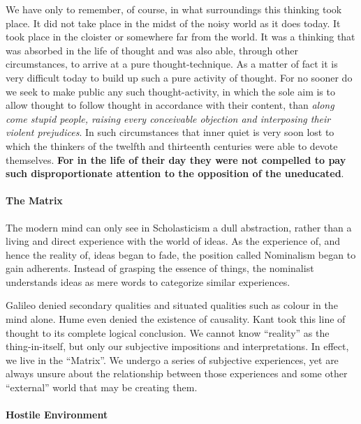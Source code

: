 \begin{quotex}
We have only to remember, of course, in what surroundings this thinking took place. It did not take place in the midst of the noisy world as it does today. It took place in the cloister or somewhere far from the world. It was a thinking that was absorbed in the life of thought and was also able, through other circumstances, to arrive at a pure thought-technique. As a matter of fact it is very difficult today to build up such a pure activity of thought. For no sooner do we seek to make public any such thought-activity, in which the sole aim is to allow thought to follow thought in accordance with their content, than \emph{along come stupid people, raising every conceivable objection and interposing their violent prejudices}. In such circumstances that inner quiet is very soon lost to which the thinkers of the twelfth and thirteenth centuries were able to devote themselves. \textbf{For in the life of their day they were not compelled to pay such disproportionate attention to the opposition of the uneducated}.
\end{quotex}


\paragraph{The Matrix}


The modern mind can only see in Scholasticism a dull abstraction, rather than a living and direct experience with the world of ideas. As the experience of, and hence the reality of, ideas began to fade, the position called Nominalism began to gain adherents. Instead of grasping the essence of things, the nominalist understands ideas as mere words to categorize similar experiences.

Galileo denied secondary qualities and situated qualities such as colour in the mind alone. Hume even denied the existence of causality. Kant took this line of thought to its complete logical conclusion. We cannot know ``reality'' as the thing-in-itself, but only our subjective impositions and interpretations. In effect, we live in the ``Matrix''. We undergo a series of subjective experiences, yet are always unsure about the relationship between those experiences and some other ``external'' world that may be creating them.

\paragraph{Hostile Environment}


